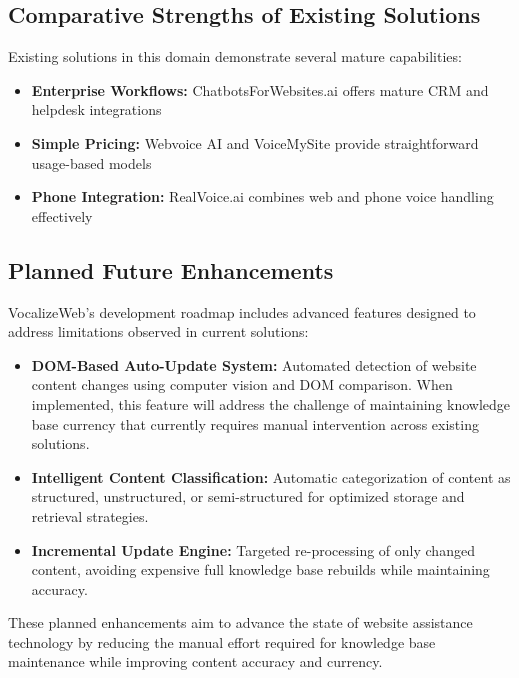 \subsection{Comparative Strengths of Existing Solutions}

Existing solutions in this domain demonstrate several mature capabilities:

\begin{itemize}[leftmargin=*]
    \item \textbf{Enterprise Workflows:} ChatbotsForWebsites.ai offers mature CRM and helpdesk integrations
    \item \textbf{Simple Pricing:} Webvoice AI and VoiceMySite provide straightforward usage-based models
    \item \textbf{Phone Integration:} RealVoice.ai combines web and phone voice handling effectively
\end{itemize}

\subsection{Planned Future Enhancements}

VocalizeWeb's development roadmap includes advanced features designed to address limitations observed in current solutions:

\begin{itemize}[leftmargin=*]
    \item \textbf{DOM-Based Auto-Update System:} Automated detection of website content changes using computer vision and DOM comparison. When implemented, this feature will address the challenge of maintaining knowledge base currency that currently requires manual intervention across existing solutions.
    
    \item \textbf{Intelligent Content Classification:} Automatic categorization of content as structured, unstructured, or semi-structured for optimized storage and retrieval strategies.
    
    \item \textbf{Incremental Update Engine:} Targeted re-processing of only changed content, avoiding expensive full knowledge base rebuilds while maintaining accuracy.
\end{itemize}

These planned enhancements aim to advance the state of website assistance technology by reducing the manual effort required for knowledge base maintenance while improving content accuracy and currency.


